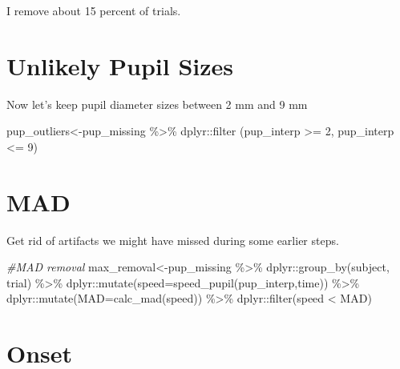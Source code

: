 \documentclass[
]{article}
\newenvironment{Shaded}{\begin{snugshade}}{\end{snugshade}}
\newcommand{\AttributeTok}[1]{\textcolor[rgb]{0.77,0.63,0.00}{#1}}
\newcommand{\CommentTok}[1]{\textcolor[rgb]{0.56,0.35,0.01}{\textit{#1}}}
\newcommand{\DecValTok}[1]{\textcolor[rgb]{0.00,0.00,0.81}{#1}}
\newcommand{\FunctionTok}[1]{\textcolor[rgb]{0.00,0.00,0.00}{#1}}
\newcommand{\NormalTok}[1]{#1}
\newcommand{\OtherTok}[1]{\textcolor[rgb]{0.56,0.35,0.01}{#1}}
\newcommand{\SpecialCharTok}[1]{\textcolor[rgb]{0.00,0.00,0.00}{#1}}
\begin{document}
I remove about 15 percent of trials.

\hypertarget{unlikely-pupil-sizes}{%
\section{Unlikely Pupil Sizes}\label{unlikely-pupil-sizes}}

Now let's keep pupil diameter sizes between 2 mm and 9 mm

\begin{Shaded}
\begin{Highlighting}[]
\NormalTok{pup\_outliers}\OtherTok{\textless{}{-}}\NormalTok{pup\_missing }\SpecialCharTok{\%\textgreater{}\%}
\NormalTok{  dplyr}\SpecialCharTok{::}\FunctionTok{filter}\NormalTok{ (pup\_interp  }\SpecialCharTok{\textgreater{}=} \DecValTok{2}\NormalTok{, pup\_interp }\SpecialCharTok{\textless{}=} \DecValTok{9}\NormalTok{)}
\end{Highlighting}
\end{Shaded}

\hypertarget{mad}{%
\section{MAD}\label{mad}}

Get rid of artifacts we might have missed during some earlier steps.

\begin{Shaded}
\begin{Highlighting}[]
  \CommentTok{\#MAD removal}
\NormalTok{max\_removal}\OtherTok{\textless{}{-}}\NormalTok{pup\_missing  }\SpecialCharTok{\%\textgreater{}\%}
\NormalTok{  dplyr}\SpecialCharTok{::}\FunctionTok{group\_by}\NormalTok{(subject, trial) }\SpecialCharTok{\%\textgreater{}\%}
\NormalTok{  dplyr}\SpecialCharTok{::}\FunctionTok{mutate}\NormalTok{(}\AttributeTok{speed=}\FunctionTok{speed\_pupil}\NormalTok{(pup\_interp,time)) }\SpecialCharTok{\%\textgreater{}\%}
\NormalTok{  dplyr}\SpecialCharTok{::}\FunctionTok{mutate}\NormalTok{(}\AttributeTok{MAD=}\FunctionTok{calc\_mad}\NormalTok{(speed)) }\SpecialCharTok{\%\textgreater{}\%}
\NormalTok{  dplyr}\SpecialCharTok{::}\FunctionTok{filter}\NormalTok{(speed }\SpecialCharTok{\textless{}}\NormalTok{ MAD)}
\end{Highlighting}
\end{Shaded}

\hypertarget{onset}{%
\section{Onset}\label{onset}}
\end{document}
